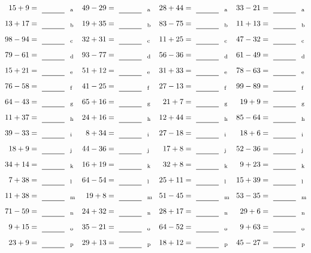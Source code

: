 \documentclass
[
  draft    = true,
  fontsize = 11pt,
  parskip  = half-
]
{scrartcl}
\begin{document}
\clearpage
\begin{align*}
    \pline{15+9}&=\rline{a}
  & \pline{49-29}&=\rline{a}
  & \pline{28+44}&=\rline{a}
  & \pline{33-21}&=\rline{a} \\[1ex]
    \pline{13+17}&=\rline{b}
  & \pline{19+35}&=\rline{b}
  & \pline{83-75}&=\rline{b}
  & \pline{11+13}&=\rline{b} \\[1ex]
    \pline{98-94}&=\rline{c}
  & \pline{32+31}&=\rline{c}
  & \pline{11+25}&=\rline{c}
  & \pline{47-32}&=\rline{c} \\[1ex]
    \pline{79-61}&=\rline{d}
  & \pline{93-77}&=\rline{d}
  & \pline{56-36}&=\rline{d}
  & \pline{61-49}&=\rline{d} \\[1ex]
    \pline{15+21}&=\rline{e}
  & \pline{51+12}&=\rline{e}
  & \pline{31+33}&=\rline{e}
  & \pline{78-63}&=\rline{e} \\[1ex]
    \pline{76-58}&=\rline{f}
  & \pline{41-25}&=\rline{f}
  & \pline{27-13}&=\rline{f}
  & \pline{99-89}&=\rline{f} \\[1ex]
    \pline{64-43}&=\rline{g}
  & \pline{65+16}&=\rline{g}
  & \pline{21+7}&=\rline{g}
  & \pline{19+9}&=\rline{g} \\[1ex]
    \pline{11+37}&=\rline{h}
  & \pline{24+16}&=\rline{h}
  & \pline{12+44}&=\rline{h}
  & \pline{85-64}&=\rline{h} \\[1ex]
    \pline{39-33}&=\rline{i}
  & \pline{8+34}&=\rline{i}
  & \pline{27-18}&=\rline{i}
  & \pline{18+6}&=\rline{i} \\[1ex]
    \pline{18+9}&=\rline{j}
  & \pline{44-36}&=\rline{j}
  & \pline{17+8}&=\rline{j}
  & \pline{52-36}&=\rline{j} \\[1ex]
    \pline{34+14}&=\rline{k}
  & \pline{16+19}&=\rline{k}
  & \pline{32+8}&=\rline{k}
  & \pline{9+23}&=\rline{k} \\[1ex]
    \pline{7+38}&=\rline{l}
  & \pline{64-54}&=\rline{l}
  & \pline{25+11}&=\rline{l}
  & \pline{15+39}&=\rline{l} \\[1ex]
    \pline{11+38}&=\rline{m}
  & \pline{19+8}&=\rline{m}
  & \pline{51-45}&=\rline{m}
  & \pline{53-35}&=\rline{m} \\[1ex]
    \pline{71-59}&=\rline{n}
  & \pline{24+32}&=\rline{n}
  & \pline{28+17}&=\rline{n}
  & \pline{29+6}&=\rline{n} \\[1ex]
    \pline{9+15}&=\rline{o}
  & \pline{35-21}&=\rline{o}
  & \pline{64-52}&=\rline{o}
  & \pline{9+63}&=\rline{o} \\[1ex]
    \pline{23+9}&=\rline{p}
  & \pline{29+13}&=\rline{p}
  & \pline{18+12}&=\rline{p}
  & \pline{45-27}&=\rline{p}
\end{align*}
\end{document}
